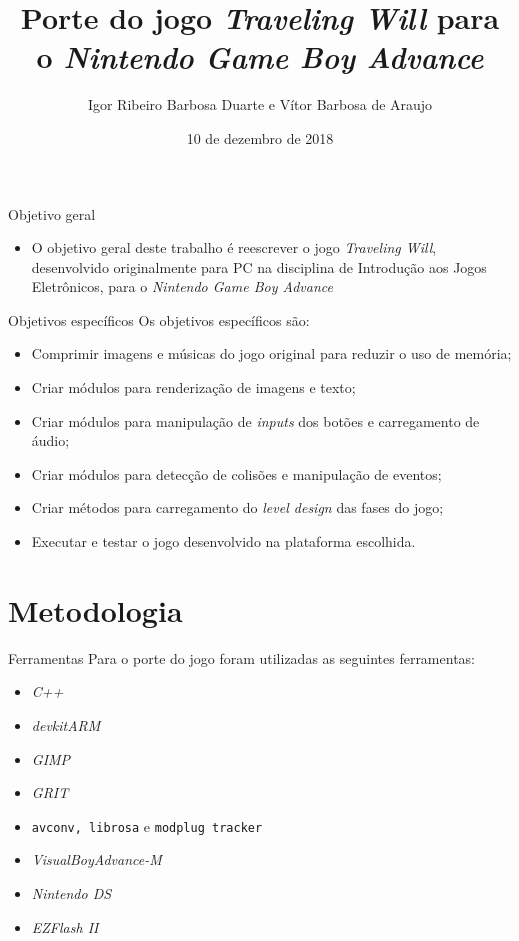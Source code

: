 \documentclass[notes, mathserif]{beamer}
\title[Porte do jogo \textit{Traveling Will} para GBA]
{Porte do jogo \textit{Traveling Will} para o \textit{Nintendo Game Boy Advance}}
\institute{Faculdade Gama
\\ Universidade de Bras\'ilia\\ Brasil}
\date{10 de dezembro de 2018}
\author[Igor Duarte e V\'itor Barbosa]
{
  Igor Ribeiro Barbosa Duarte e V\'itor Barbosa de Araujo
}
\begin{document}
 \frame{\titlepage}

\begin{frame}{Objetivo geral}
	\begin{itemize}[<+->]
		\item O objetivo geral deste trabalho \'e reescrever o jogo \textit{Traveling Will}, desenvolvido originalmente para PC na disciplina de Introdu\c c\~ao aos Jogos Eletr\^onicos, para o \textit{Nintendo Game Boy Advance}
	\end{itemize}
\end{frame}

\begin{frame}{Objetivos espec\'ificos}
	Os objetivos espec\'ificos s\~ao:
	\begin{itemize}[<+->]
		\item Comprimir imagens e m\'usicas do jogo original para reduzir o uso de mem\'oria;
		\item Criar m\'odulos para renderiza\c c\~ao de imagens e texto;
		\item Criar m\'odulos para manipula\c c\~ao de \textit{inputs} dos bot\~oes e carregamento de \'audio;
		\item Criar m\'odulos para detec\c c\~ao de colis\~oes e manipula\c c\~ao de eventos;
		\item Criar m\'etodos para carregamento do \textit{level design} das fases do jogo;
		\item Executar e testar o jogo desenvolvido na plataforma escolhida.
	\end{itemize}
\end{frame}

\section{Metodologia}

\begin{frame}{Ferramentas}
	Para o porte do jogo foram utilizadas as seguintes ferramentas:

		\begin{itemize}[<+->]
			\item \textit{C++}
			\item \textit{devkitARM}
			\item \textit{GIMP}
			\item \textit{GRIT}
			\item \texttt{avconv, librosa} e \texttt{modplug tracker}
			\item \textit{VisualBoyAdvance-M}
			\item \textit{Nintendo DS}
			\item \textit{EZFlash II}
		\end{itemize}
\end{frame}
\end{document}
